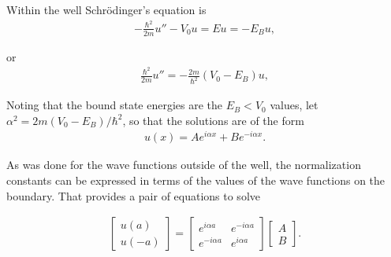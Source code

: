 Within the well Schr\"{o}dinger's equation is
\begin{align}\label{eqn:qmIproblemSet4:125}
-\frac{\hbar^2}{2m} u'' - V_0 u = E u = - E_B u,
\end{align}

or
\begin{align}\label{eqn:qmIproblemSet4:126}
\frac{\hbar^2}{2m} u'' = - \frac{2m}{\hbar^2} (V_0 - E_B) u,
\end{align}

Noting that the bound state energies are the $E_B < V_0$ values, let $\alpha^2 = 2m (V_0 - E_B)/\hbar^2$, so that the solutions are of the form
\begin{align}\label{eqn:qmIproblemSet4:130}
u(x) = A e^{i\alpha x} + B e^{-i\alpha x}.
\end{align}

As was done for the wave functions outside of the well, the normalization constants can be expressed in terms of the values of the wave functions on the boundary.  That provides a pair of equations to solve

\begin{align}\label{eqn:qmIproblemSet4:135}
\begin{bmatrix}
u(a) \\
u(-a)
\end{bmatrix}
=
\begin{bmatrix}
e^{i \alpha a} & e^{-i \alpha a} \\
e^{-i \alpha a} & e^{i \alpha a}
\end{bmatrix}
\begin{bmatrix}
A \\
B
\end{bmatrix}.
\end{align}

